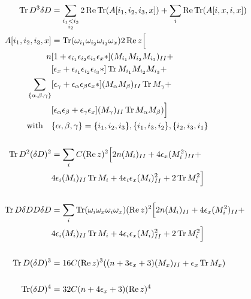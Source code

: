 \begin{enumerate}
\begin{align}
\operatorname{Tr} D^3 \delta D &= \sum_{\substack{i_1 < i_3 \\ i_2}} 2 \operatorname{Re} \operatorname{Tr} (A[i_1, i_2, i_3, x]) + \sum_{i} \operatorname{Re} \operatorname{Tr} (A[i, x, i, x]) \notag \\
A[i_1, i_2, i_3, x] &= \operatorname{Tr} ( \omega_{i_1} \omega_{i_2} \omega_{i_3} \omega_x ) 2 \operatorname{Re} z \Big[ \notag \\
n &[1 + \epsilon_{i_1} \epsilon_{i_2} \epsilon_{i_3} \epsilon_{x} *](M_{i_1}M_{i_2}M_{i_3})_{II} + \notag \\
&[\epsilon_x + \epsilon_{i_1} \epsilon_{i_2} \epsilon_{i_3} *]\operatorname{Tr} M_{i_1}M_{i_2}M_{i_3} + \notag \\
\sum_{\{\alpha, \beta, \gamma\} }  & [\epsilon_{\gamma} + \epsilon_{\alpha} \epsilon_{\beta} \epsilon_x * ] (M_{\alpha} M_{\beta})_{II} \operatorname{Tr} M_{\gamma} + \notag \\
& [\epsilon_{\alpha} \epsilon_{\beta}  + \epsilon_{\gamma} \epsilon_x] (M_{\gamma})_{II} \operatorname{Tr} M_{\alpha} M_{\beta}) \Big] \\
\text{with} \quad &\{\alpha, \beta, \gamma\} = \{ i_1, i_2, i_3 \}, \{i_1, i_3, i_2 \}, \{ i_2, i_3, i_1 \} \notag \\
\notag \\
\operatorname{Tr} D^2 (\delta D)^2 &= \sum_{i} C (\operatorname{Re} z)^2 \Big[ 2n(M_i)_{II} + 4 \epsilon_x (M_i^2)_{II} + \notag \\
&4 \epsilon_i (M_i)_{II} \operatorname{Tr} M_i  + 4 \epsilon_i \epsilon_x (M_i)_{II}^2 + 2 \operatorname{Tr} M_i^2 \Big] \\
\notag \\
\operatorname{Tr} D \delta D D \delta D &= \sum_i \operatorname{Tr} ( \omega_{i} \omega_{x} \omega_{i} \omega_x ) (\operatorname{Re} z)^2 \Big[ 2n(M_i)_{II} + 4 \epsilon_x (M_i^2)_{II} + \notag \\
&4 \epsilon_i (M_i)_{II} \operatorname{Tr} M_i  + 4 \epsilon_i \epsilon_x (M_i)_{II}^2 + 2 \operatorname{Tr} M_i^2 \Big] \\
\notag \\
\operatorname{Tr} D (\delta D)^3 &= 16 C (\operatorname{Re} z)^3 ( (n+3\epsilon_x + 3)(M_x)_{II} + \epsilon_x \operatorname{Tr} M_x ) \\
\notag \\
\operatorname{Tr} (\delta D)^4 &= 32 C (n+4 \epsilon_x +3) (\operatorname{Re} z)^4
\end{align}
\end{enumerate}